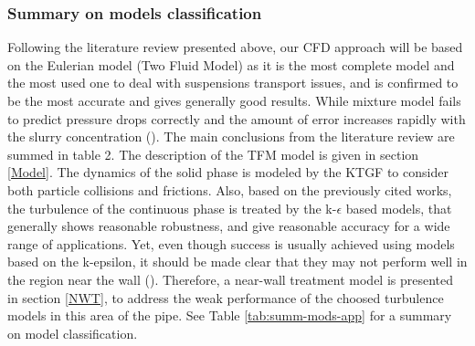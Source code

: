 \documentclass[11pt]{report}
\begin{document}
\subsubsection{Summary on models classification}
Following the literature review presented above, our CFD approach will be based on the Eulerian model (Two Fluid Model) as it is the most complete model and the most used one to deal with suspensions transport issues, 
%
and is confirmed to be the most accurate and  gives generally good results.
%
While mixture model fails to predict pressure drops correctly and the amount of error increases rapidly with the slurry concentration  (\citet{D.R-2012}).  
%
The main conclusions from the literature review are summed in table 2. 
%
The description of the TFM model is given in section \ref{Model}. 
%
The dynamics of the solid phase is modeled by the KTGF to consider both particle collisions and frictions. 
%
Also, based on the previously cited works, the turbulence of the continuous phase is treated by the k-$\epsilon$ based models, that generally shows reasonable robustness, and give reasonable accuracy for a wide range of applications. 
%
Yet, even though success is usually achieved using models based on the k-epsilon, it should be made clear that they may not perform well in the region near the wall (\citet{antaya2012modelling}). 
%
Therefore, a near-wall treatment model is presented in section \ref{NWT}, to address the weak performance of the choosed turbulence models in this area of the pipe. See Table \ref{tab:summ-mods-app} for a summary on model classification.
%
\end{document}
